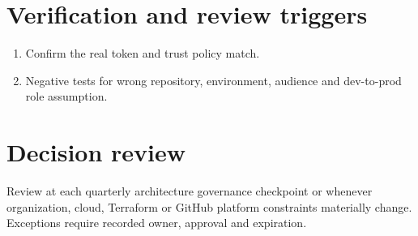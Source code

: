 \documentclass[11pt]{article}
\begin{document}
\section*{Verification and review triggers}
\begin{enumerate}[leftmargin=*]
\item Confirm the real token and trust policy match.
\item Negative tests for wrong repository, environment, audience and dev-to-prod role assumption.
\end{enumerate}
\section*{Decision review}
Review at each quarterly architecture governance checkpoint or whenever organization, cloud, Terraform or GitHub platform constraints materially change. Exceptions require recorded owner, approval and expiration.
\end{document}
